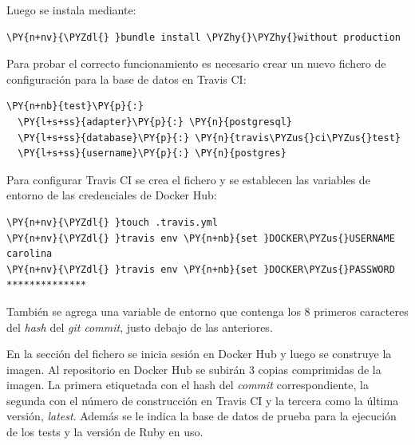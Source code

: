 Luego se instala mediante:

\begin{framed_shaded}
\begin{Verbatim}[fontsize=\relsize{-2.5},fontseries=b,commandchars=\\\{\}]
\PY{n+nv}{\PYZdl{} }bundle install \PYZhy{}\PYZhy{}without production
\end{Verbatim}
\end{framed_shaded}

Para probar el correcto funcionamiento es necesario crear un nuevo fichero de configuración para la base de datos en Travis CI:

\begin{codelisting}
\label{code:travisdatabase}
\begin{Verbatim}[fontsize=\relsize{-2.5},fontseries=b,commandchars=\\\{\}]
\PY{n+nb}{test}\PY{p}{:}
  \PY{l+s+ss}{adapter}\PY{p}{:} \PY{n}{postgresql}
  \PY{l+s+ss}{database}\PY{p}{:} \PY{n}{travis\PYZus{}ci\PYZus{}test}
  \PY{l+s+ss}{username}\PY{p}{:} \PY{n}{postgres}
\end{Verbatim}
\end{codelisting}

Para configurar Travis CI se crea el fichero  y se establecen las variables de entorno de las credenciales de Docker Hub:

\begin{framed_shaded}
\begin{Verbatim}[fontsize=\relsize{-2.5},fontseries=b,commandchars=\\\{\}]
\PY{n+nv}{\PYZdl{} }touch .travis.yml
\PY{n+nv}{\PYZdl{} }travis env \PY{n+nb}{set }DOCKER\PYZus{}USERNAME carolina
\PY{n+nv}{\PYZdl{} }travis env \PY{n+nb}{set }DOCKER\PYZus{}PASSWORD **************
\end{Verbatim}
\end{framed_shaded}

También se agrega una variable de entorno que contenga los 8 primeros caracteres del \textit{hash} del \textit{git commit}, justo debajo de las anteriores.

En la sección  del fichero se inicia sesión en Docker Hub y luego se construye la imagen. Al repositorio en Docker Hub se subirán 3 copias comprimidas de la imagen. La primera etiquetada con el hash del \textit{commit} correspondiente, la segunda con el número de construcción en Travis CI y la tercera como la última versión, \textit{latest}. Además se le indica la base de datos de prueba para la ejecución de los tests y la versión de Ruby en uso.

